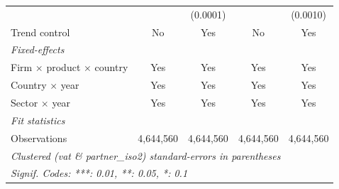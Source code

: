 \begin{table}[htbp]
\begin{tabular}{lcccc}
                                               &                 & (0.0001)        &              & (0.0010)\\   
      Trend control                            & No              & Yes             & No           & Yes\\  
      \midrule
      \emph{Fixed-effects}\\
      Firm $\times$ product $\times$ country   & Yes             & Yes             & Yes          & Yes\\  
      Country $\times$ year                    & Yes             & Yes             & Yes          & Yes\\  
      Sector $\times$ year                     & Yes             & Yes             & Yes          & Yes\\  
      \midrule
      \emph{Fit statistics}\\
      Observations                             & 4,644,560       & 4,644,560       & 4,644,560    & 4,644,560\\  
      \midrule \midrule
      \multicolumn{5}{l}{\emph{Clustered (vat \& partner\_iso2) standard-errors in parentheses}}\\
      \multicolumn{5}{l}{\emph{Signif. Codes: ***: 0.01, **: 0.05, *: 0.1}}\\
   \end{tabular}
\end{table}


